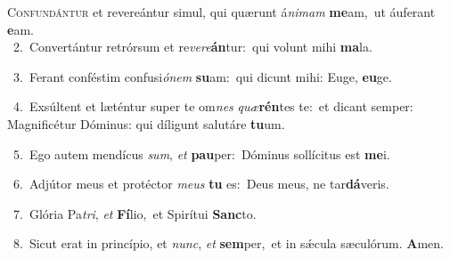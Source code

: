 \lettrine{\initial\textcolor{\initialcolor}{C}}{onfundántur} et revereántur simul, qui quærunt á\-\textit{ni}\-\textit{mam} \textbf{me}\-am,~\star ut áuferant \textbf{e}\-am.\\
{\numbfont\textcolor{\numbcolor}{~2.}}~Convertántur retrórsum et re\-\textit{ve}\-\textit{re}\textbf{án}tur:~\star qui volunt mihi \textbf{ma}\-la.\par
{\numbfont\textcolor{\numbcolor}{~3.}}~Ferant conféstim confusi\-\textit{ó}\-\textit{nem} \textbf{su}\-am:~\star qui dicunt mihi: Euge, \textbf{eu}\-ge.\par
{\numbfont\textcolor{\numbcolor}{~4.}}~Exsúltent et læténtur super te om\textit{nes} \textit{quæ}\-\textbf{rén}tes te:~\star et dicant semper: Magnificétur Dóminus: qui díligunt salutáre \textbf{tu}\-um.\par
{\numbfont\textcolor{\numbcolor}{~5.}}~Ego autem mendícus \textit{sum}\-, \textit{et} \textbf{pau}\-per:~\star Dóminus sollícitus est \textbf{me}\-i.\par
{\numbfont\textcolor{\numbcolor}{~6.}}~Adjútor meus et protéctor \textit{me}\-\textit{us} \textbf{tu} es:~\star Deus meus, ne tar\-\textbf{dá}\-veris.\par
{\numbfont\textcolor{\numbcolor}{~7.}}~Glória Pa\-\textit{tri}\-, \textit{et} \textbf{Fí}\-lio,~\star et Spirítui \textbf{Sanc}\-to.\par
{\numbfont\textcolor{\numbcolor}{~8.}}~Sicut erat in princípio, et \textit{nunc}\-, \textit{et} \textbf{sem}\-per,~\star et in sǽcula sæculórum. \textbf{A}\-men.\par
